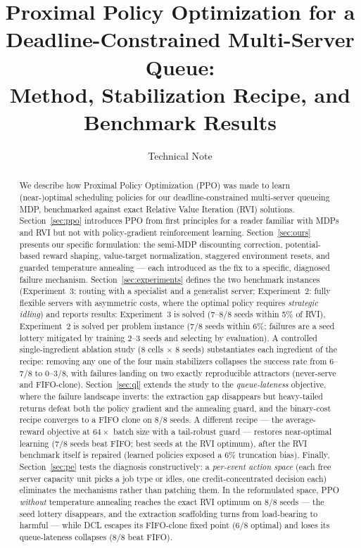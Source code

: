 \documentclass[11pt,a4paper]{article}
\title{Proximal Policy Optimization for a Deadline-Constrained
       Multi-Server Queue:\\
       Method, Stabilization Recipe, and Benchmark Results}
\author{Technical Note}
\date{}
\begin{document}
\maketitle

\begin{abstract}
We describe how Proximal Policy Optimization (PPO) was made to learn
(near-)optimal scheduling policies for our deadline-constrained
multi-server queueing MDP, benchmarked against exact Relative Value
Iteration (RVI) solutions.
Section~\ref{sec:ppo} introduces PPO from first principles for a reader
familiar with MDPs and RVI but not with policy-gradient reinforcement
learning.
Section~\ref{sec:ours} presents our specific formulation: the semi-MDP
discounting correction, potential-based reward shaping, value-target
normalization, staggered environment resets, and guarded temperature
annealing --- each introduced as the fix to a specific, diagnosed failure
mechanism.
Section~\ref{sec:experiments} defines the two benchmark instances
(Experiment~3: routing with a specialist and a generalist server;
Experiment~2: fully flexible servers with asymmetric costs, where the
optimal policy requires \emph{strategic idling}) and reports results:
Experiment~3 is solved (7--8/8 seeds within 5\% of RVI), Experiment~2 is
solved per problem instance (7/8 seeds within 6\%; failures are a seed
lottery mitigated by training 2--3 seeds and selecting by evaluation).
A controlled single-ingredient ablation study (8 cells $\times$ 8 seeds)
substantiates each ingredient of the recipe: removing any one of the four
main stabilizers collapses the success rate from 6--7/8 to 0--3/8, with
failures landing on two exactly reproducible attractors (never-serve and
FIFO-clone).
Section~\ref{sec:ql} extends the study to the \emph{queue-lateness}
objective, where the failure landscape inverts: the extraction gap
disappears but heavy-tailed returns defeat both the policy gradient and
the annealing guard, and the binary-cost recipe converges to a FIFO clone
on 8/8 seeds.  A different recipe --- the average-reward objective at
$64\times$ batch size with a tail-robust guard --- restores near-optimal
learning (7/8 seeds beat FIFO; best seeds at the RVI optimum), after the
RVI benchmark itself is repaired (learned policies exposed a 6\%
truncation bias).
Finally, Section~\ref{sec:pe} tests the diagnosis constructively: a
\emph{per-event action space} (each free server capacity unit picks a
job type or idles, one credit-concentrated decision each) eliminates the
mechanisms rather than patching them.  In the reformulated space, PPO
\emph{without} temperature annealing reaches the exact RVI optimum on
8/8 seeds --- the seed lottery disappears, and the extraction scaffolding
turns from load-bearing to harmful --- while DCL escapes its FIFO-clone
fixed point (6/8 optimal) and loses its queue-lateness collapses (8/8
beat FIFO).
\end{abstract}
\end{document}
